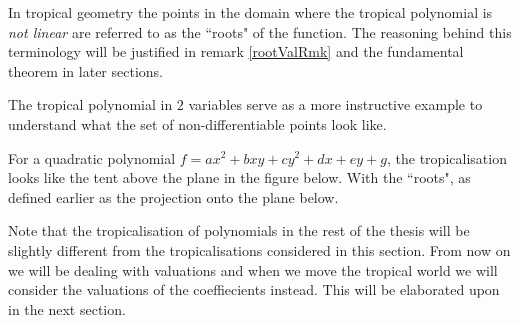 \par In tropical geometry the points in the domain where the tropical polynomial is \textit{not linear} are referred to as the ``roots" of the function.
The reasoning behind this terminology will be justified in remark \ref{rootValRmk} and the fundamental theorem in later sections.
\par The tropical polynomial in $2$ variables serve as a more instructive example to understand what the set of non-differentiable points look like. 

\begin{example}
    For a quadratic polynomial $f = ax^{2} + bxy + cy^{2} + dx + ey + g$, the tropicalisation looks like the tent above the plane in the figure below. 
    With the ``roots", as defined earlier as the projection onto the plane below.
    \begin{figure}[ht]
        \centering
    \end{figure}
\end{example}

\begin{remark}
    \label{rmkOnTropPol}
    Note that the tropicalisation of polynomials in the rest of the thesis will be slightly different from the tropicalisations considered in this section.
    From now on we will be dealing with valuations and when we move the tropical world we will consider the valuations of the coeffiecients instead. 
    This will be elaborated upon in the next section.
\end{remark}

